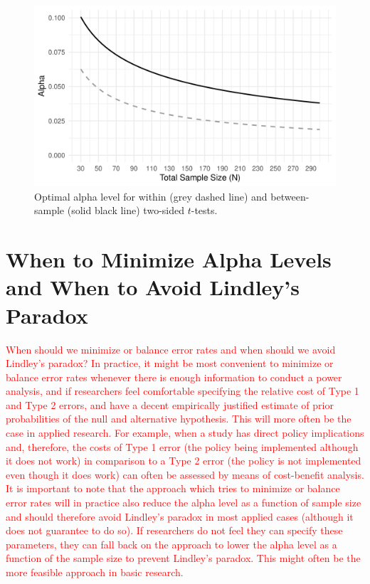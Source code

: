 \documentclass[
  english,
  ,man, a4paper,floatsintext]{apa6}
\begin{document}
\begin{figure}
\centering
\includegraphics{Justify_in_Practice_files/figure-latex/lindleyplot-1.pdf}
\caption{\label{fig:lindleyplot}Optimal alpha level for within (grey dashed line) and between-sample (solid black line) two-sided \(t\)-tests.}
\end{figure}

\hypertarget{when-to-minimize-alpha-levels-and-when-to-avoid-lindleys-paradox}{%
\section{When to Minimize Alpha Levels and When to Avoid Lindley's Paradox}\label{when-to-minimize-alpha-levels-and-when-to-avoid-lindleys-paradox}}

\textcolor{red}{When should we minimize or balance error rates and when should we avoid Lindley's paradox? In practice, it might be most convenient to minimize or balance error rates whenever there is enough information to conduct a power analysis, and if researchers feel comfortable specifying the relative cost of Type 1 and Type 2 errors, and have a decent empirically justified estimate of prior probabilities of the null and alternative hypothesis. This will more often be the case in applied research. For example, when a study has direct policy implications and, therefore, the costs of Type 1 error (the policy being implemented although it does not work) in comparison to a Type 2 error (the policy is not implemented even though it does work) can often be assessed by means of cost-benefit analysis. It is important to note that the approach which tries to minimize or balance error rates will in practice also reduce the alpha level as a function of sample size and should therefore avoid Lindley’s paradox in most applied cases (although it does not guarantee to do so). If researchers do not feel they can specify these parameters, they can fall back on the approach to lower the alpha level as a function of the sample size to prevent Lindley’s paradox. This might often be the more feasible approach in basic research.}
\end{document}
